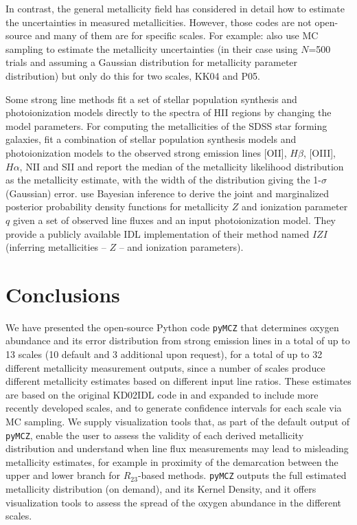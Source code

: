 \documentclass{emulateapj}
\begin{document}
In contrast, the general metallicity field has considered in detail how to estimate the uncertainties in measured metallicities. However, those codes are not open-source and many of them are for specific scales. For example: \citet{moustakas10} also use MC sampling to estimate the metallicity uncertainties (in their case using $N$=500 trials and assuming a Gaussian distribution for metallicity parameter distribution) but only do this for two scales, KK04 and P05. 

Some strong line methods fit a set of stellar population synthesis and photoionization models directly to the spectra of HII regions by changing the model parameters. For computing the metallicities of the SDSS star forming galaxies, \citet{tremonti04} fit a combination of stellar population synthesis models and  photoionization models to the observed strong emission lines [OII], $H\beta$, [OIII], $H\alpha$, NII and SII and report the median of the metallicity likelihood distribution as the metallicity estimate, with the width of the distribution giving the 1-$\sigma$ (Gaussian) error.
 \citet{blanc15} 
use Bayesian inference to derive the joint and marginalized posterior probability density functions for metallicity $Z$ and ionization parameter $q$ given a set of observed line fluxes and an input photoionization model. They provide a publicly available IDL implementation of their method named $IZI$ (inferring metallicities -- $Z$ -- and ionization parameters).


\section{Conclusions}\label{conclusions_sec}
We have presented the open-source Python code \verb=pyMCZ= that determines oxygen abundance and its error distribution from strong emission lines in a total of up to 13 scales (10 default and 3 additional upon request), for a total of up to 32 different metallicity measurement outputs, since a number of scales produce different metallicity estimates based on different input line ratios. These estimates are based on the original KD02IDL code in \citet{kewley02} and expanded to include more recently developed scales, and to generate confidence intervals for each scale via MC sampling. We supply visualization tools that, as part of the default output of \verb=pyMCZ=, enable the user to assess the validity of each derived metallicity distribution and understand when line flux measurements may lead to misleading metallicity estimates, for example in proximity of the demarcation between the upper and lower branch for $R_{23}$-based methods. \verb=pyMCZ= outputs the full estimated metallicity distribution (on demand), and its Kernel Density, and it offers  visualization tools to assess the spread of the oxygen abundance in the different scales. 
\end{document}

